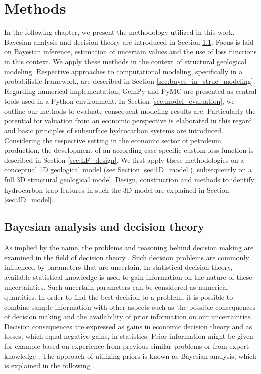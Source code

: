    \chapter{Methods}\label{cha:met}
    In the following chapter, we present the methodology utilized in this work. Bayesian analysis and decision theory are introduced in Section \ref{sec:bayes}. Focus is laid on Bayesian inference, estimation of uncertain values and the use of loss functions in this context. 
    We apply these methods in the context of structural geological modeling. Respective approaches to computational modeling, specifically in a probabilistic framework, are described in Section \ref{sec:bayes_in_struc_modeling}. Regarding numerical implementation, GemPy and PyMC are presented as central tools used in a Python environment. In Section \ref{sec:model_evaluation}, we outline our methods to evaluate consequent modeling results are. Particularly the potential for valuation from an economic perspective is elaborated in this regard and basic principles of subsurface hydrocarbon systems are introduced. Considering the respective setting in the economic sector of petroleum production, the development of an according case-specific custom loss function is described in Section \ref{sec:LF_design}. We first apply these methodologies on a conceptual 1D geological model (see Section \ref{sec:1D_model}), subsequently on a full 3D structural geological model. Design, construction and methods to identify hydrocarbon trap features in such the 3D model are explained in Section \ref{sec:3D_model}.
        
        \section{Bayesian analysis and decision theory}\label{sec:bayes}
	    As implied by the name, the problems and reasoning behind decision making are examined in the field of decision theory \citep{berger2013stat}. Such decision problems are commonly influenced by parameters that are uncertain. In statistical decision theory, available statistical knowledge is used to gain information on the nature of these uncertainties. Such uncertain parameters can be considered as numerical quantities. In order to find the best decision to a problem, it is possible to combine sample information with other aspects such as the possible consequences of decision making and the availability of prior information on our uncertainties. Decision consequences are expressed as gains in economic decision theory and as losses, which equal negative gains, in statistics. Prior information might be given for example based on experience from previous similar problems or from expert knowledge \citep{bratvold2010making}. The approach of utilizing priors is known as Bayesian analysis, which is explained in the following \citep{berger2013stat}. %
	    
